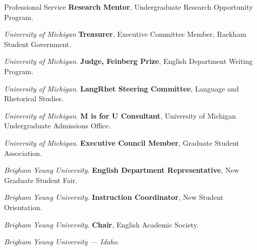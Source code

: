 \begin{rubric}{Professional Service}
    \entry*[2022 -- 2023]%
        \textbf{Research Mentor}, Undergraduate Research Opportunity Program.
        \par\emph{University of Michigan}
    \entry*[2019 -- 2022]%
        \textbf{Treasurer}, Executive Committee Member, Rackham Student Government.
        \par\emph{University of Michigan}.
    \entry*[2019 -- 2022]%
        \textbf{Judge, Feinberg Prize}, English Department Writing Program.
        \par\emph{University of Michigan}.
    \entry*[2020 -- 2021]%
        \textbf{LangRhet Steering Committee}, Language and Rhetorical Studies.
        \par\emph{University of Michigan}.
    \entry*[2019]%
        \textbf{M is for U Consultant}, University of Michigan Undergraduate Admissions Office.
        \par\emph{University of Michigan}.
    \entry*[2016 -- 2018]%
        \textbf{Executive Council Member}, Graduate Student Association.
        \par\emph{Brigham Young University}.
    \entry*[2017 -- 2018]%
        \textbf{English Department Representative}, New Graduate Student Fair.
        \par\emph{Brigham Young University}.
    \entry*[2018 -- 2019]%
        \textbf{Instruction Coordinator}, New Student Orientation.
        \par\emph{Brigham Young University}.
    \entry*[2013 -- 2015]%
        \textbf{Chair}, English Academic Society.
        \par\emph{Brigham Young University --- Idaho}.
    \end{rubric}